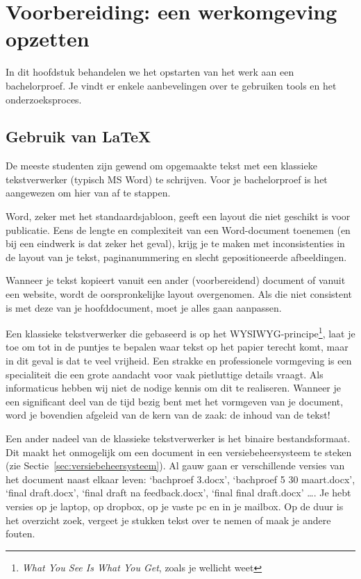 \chapter{Voorbereiding: een werkomgeving opzetten}
\label{ch:voorbereiding}

In dit hoofdstuk behandelen we het opstarten van het werk aan een bachelorproef. Je vindt er enkele aanbevelingen over te gebruiken tools en het onderzoeksproces.

\section{Gebruik van {\LaTeX}}
\label{sec:gebruik-van-latex}

De meeste studenten zijn gewend om opgemaakte tekst met een klassieke tekstverwerker (typisch MS Word) te schrijven. Voor je bachelorproef is het aangewezen om hier van af te stappen.

Word, zeker met het standaardsjabloon, geeft een layout die niet geschikt is voor publicatie. Eens de lengte en complexiteit van een Word-document toenemen (en bij een eindwerk is dat zeker het geval), krijg je te maken met inconsistenties in de layout van je tekst, paginanummering en slecht gepositioneerde afbeeldingen.

Wanneer je tekst kopieert vanuit een ander (voorbereidend) document of vanuit een website, wordt de oorspronkelijke layout overgenomen. Als die niet consistent is met deze van je hoofddocument, moet je alles gaan aanpassen.

Een klassieke tekstverwerker die gebaseerd is op het WYSIWYG-principe\footnote{\emph{What You See Is What You Get}, zoals je wellicht weet}, laat je toe om tot in de puntjes te bepalen waar tekst op het papier terecht komt, maar in dit geval is dat te veel vrijheid. Een strakke en professionele vormgeving is een specialiteit die een grote aandacht voor vaak pietluttige  details vraagt. Als informaticus hebben wij niet de nodige kennis om dit te realiseren. Wanneer je een significant deel van de tijd bezig bent met het vormgeven van je document, word je bovendien afgeleid van de kern van de zaak: de inhoud van de tekst!

Een ander nadeel van de klassieke tekstverwerker is het binaire bestandsformaat. Dit maakt het onmogelijk om een document in een versiebeheersysteem te steken (zie Sectie~\ref{sec:versiebeheersysteem}). Al gauw gaan er verschillende versies van het document naast elkaar leven: `bachproef 3.docx', `bachproef 5 30 maart.docx', `final draft.docx', `final draft na feedback.docx', `final final draft.docx' \dots. Je hebt versies op je laptop, op dropbox, op je vaste pc en in je mailbox. Op de duur is het overzicht zoek, vergeet je stukken tekst over te nemen of maak je andere fouten.

